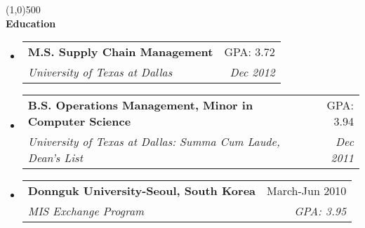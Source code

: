 \documentclass[letterpaper,11pt]{article}
\makeatletter
\newcommand{\resheading}[1]{{\large {\textbf{#1 \vphantom{p\^{E}}}}}}
\newcommand{\addline}{\line(1,0){500}}
\newcommand{\ressubheading}[4]{
	\begin{tabular*}{6.5in}{l@{\extracolsep{\fill}}r}
			\textbf{#1} & #2 \\
			\textit{#3} & \textit{#4} \\
	\end{tabular*}\vspace{-6pt}}
\makeatother
\begin{document}
\addline
\\
\resheading{Education}
\begin{itemize}
\item
	\ressubheading{M.S. Supply Chain Management}{GPA: 3.72}
{University of Texas at Dallas}{Dec 2012}	

\item
	\ressubheading{B.S. Operations Management, Minor in Computer Science}
		{GPA: 3.94}{University of Texas at Dallas: Summa Cum Laude, Dean's 
			List}{Dec 2011}	

\item
	\ressubheading{Donnguk University-Seoul, South Korea}{March-Jun 2010}{MIS 
		Exchange Program}{GPA: 3.95}
\end{itemize}
\end{document}
